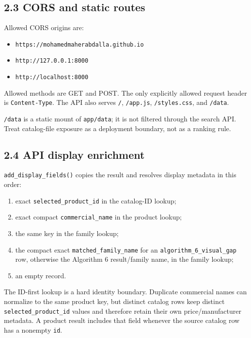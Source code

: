 \subsection{2.3 CORS and static routes}\label{23-cors-and-static-routes}

Allowed CORS origins are:

\begin{itemize}
\tightlist
\item
  \texttt{https://mohamedmaherabdalla.github.io}
\item
  \texttt{http://127.0.0.1:8000}
\item
  \texttt{http://localhost:8000}
\end{itemize}

Allowed methods are GET and POST. The only explicitly allowed request header is \texttt{Content-Type}. The API also serves \texttt{/}, \texttt{/app.js}, \texttt{/styles.css}, and \texttt{/data}.

\texttt{/data} is a static mount of \texttt{app/data}; it is not filtered through the search API. Treat catalog-file exposure as a deployment boundary, not as a ranking rule.

\subsection{2.4 API display enrichment}\label{24-api-display-enrichment}

\texttt{add\_\allowbreak{}display\_\allowbreak{}fields()} copies the result and resolves display metadata in this order:

\begin{enumerate}
\def\labelenumi{\arabic{enumi}.}
\tightlist
\item
  exact \texttt{selected\_\allowbreak{}product\_\allowbreak{}id} in the catalog-ID lookup;
\item
  exact compact \texttt{commercial\_\allowbreak{}name} in the product lookup;
\item
  the same key in the family lookup;
\item
  the compact exact \texttt{matched\_\allowbreak{}family\_\allowbreak{}name} for an \texttt{algorithm\_\allowbreak{}6\_\allowbreak{}visual\_\allowbreak{}gap} row, otherwise the Algorithm 6 result/family name, in the family lookup;
\item
  an empty record.
\end{enumerate}

The ID-first lookup is a hard identity boundary. Duplicate commercial names can normalize to the same product key, but distinct catalog rows keep distinct \texttt{selected\_\allowbreak{}product\_\allowbreak{}id} values and therefore retain their own price/manufacturer metadata. A product result includes that field whenever the source catalog row has a nonempty \texttt{id}.

